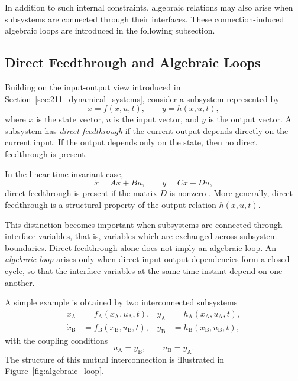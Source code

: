 In addition to such internal constraints, algebraic relations may also arise when subsystems are connected through their interfaces.
These connection-induced algebraic loops are introduced in the following subsection.

\subsection{Direct Feedthrough and Algebraic Loops}
\label{sec:213_direct_feedthrough}

Building on the input-output view introduced in Section~\ref{sec:211_dynamical_systems}, consider a subsystem represented by
\begin{equation}
    \dot{x} = f(x,u,t),
    \qquad
    y = h(x,u,t),
\end{equation}
where $x$ is the state vector, $u$ is the input vector, and $y$ is the output vector.
A subsystem has \emph{direct feedthrough} if the current output depends directly on the current input.
If the output depends only on the state, then no direct feedthrough is present.

In the linear time-invariant case,
\begin{equation}
    \dot{x} = Ax + Bu,
    \qquad
    y = Cx + Du,
\end{equation}
direct feedthrough is present if the matrix $D$ is nonzero \cite{astrom_feedback_2008}.
More generally, direct feedthrough is a structural property of the output relation $h(x,u,t)$.

This distinction becomes important when subsystems are connected through interface variables, that is, variables which are exchanged across subsystem boundaries.
Direct feedthrough alone does not imply an algebraic loop.
An \emph{algebraic loop} arises only when direct input-output dependencies form a closed cycle, so that the interface variables at the same time instant depend on one another.

A simple example is obtained by two interconnected subsystems
\begin{align}
    \dot{x}_\mathrm{A} &= f_\mathrm{A}(x_\mathrm{A},u_\mathrm{A},t),
    & y_\mathrm{A} &= h_\mathrm{A}(x_\mathrm{A},u_\mathrm{A},t), \\
    \dot{x}_\mathrm{B} &= f_\mathrm{B}(x_\mathrm{B},u_\mathrm{B},t),
    & y_\mathrm{B} &= h_\mathrm{B}(x_\mathrm{B},u_\mathrm{B},t),
\end{align}
with the coupling conditions
\begin{equation}
    u_\mathrm{A} = y_\mathrm{B},
    \qquad
    u_\mathrm{B} = y_\mathrm{A}.
\end{equation}
The structure of this mutual interconnection is illustrated in Figure~\ref{fig:algebraic_loop}.

